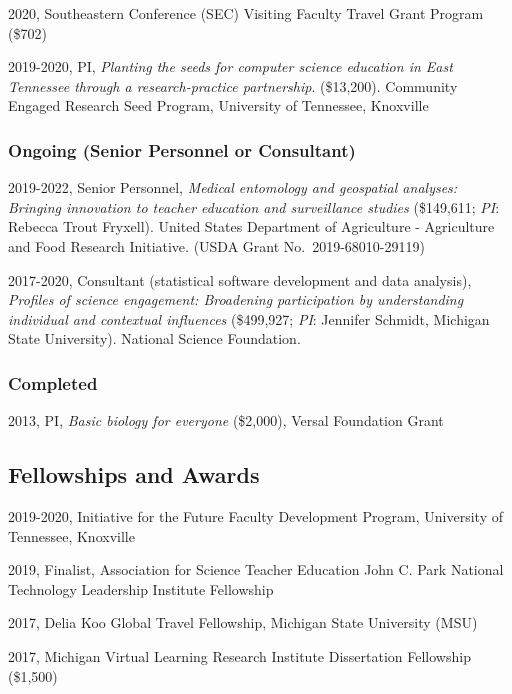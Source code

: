 \documentclass[14,]{article}
\begin{document}
2020, Southeastern Conference (SEC) Visiting Faculty Travel Grant
Program (\$702)

2019-2020, PI, \emph{Planting the seeds for computer science education
in East Tennessee through a research-practice partnership}. (\$13,200).
Community Engaged Research Seed Program, University of Tennessee,
Knoxville

\hypertarget{ongoing-senior-personnel-or-consultant}{%
\subsubsection{Ongoing (Senior Personnel or
Consultant)}\label{ongoing-senior-personnel-or-consultant}}

2019-2022, Senior Personnel, \emph{Medical entomology and geospatial
analyses: Bringing innovation to teacher education and surveillance
studies} (\$149,611; \emph{PI}: Rebecca Trout Fryxell). United States
Department of Agriculture - Agriculture and Food Research Initiative.
(USDA Grant No.~2019-68010-29119)

2017-2020, Consultant (statistical software development and data
analysis), \emph{Profiles of science engagement: Broadening
participation by understanding individual and contextual influences}
(\$499,927; \emph{PI}: Jennifer Schmidt, Michigan State University).
National Science Foundation.

\hypertarget{completed}{%
\subsubsection{Completed}\label{completed}}

2013, PI, \emph{Basic biology for everyone} (\$2,000), Versal Foundation
Grant

\hypertarget{fellowships-and-awards}{%
\subsection{Fellowships and Awards}\label{fellowships-and-awards}}

2019-2020, Initiative for the Future Faculty Development Program,
University of Tennessee, Knoxville

2019, Finalist, Association for Science Teacher Education John C. Park
National Technology Leadership Institute Fellowship

2017, Delia Koo Global Travel Fellowship, Michigan State University
(MSU)

2017, Michigan Virtual Learning Research Institute Dissertation
Fellowship (\$1,500)
\end{document}
